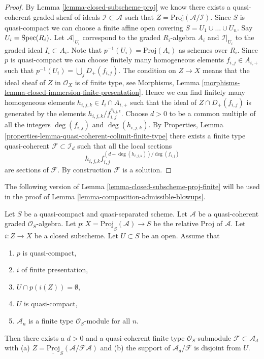 \begin{proof}
By Lemma \ref{lemma-closed-subscheme-proj} we know there exists a
quasi-coherent graded sheaf of ideals $\mathcal{I} \subset \mathcal{A}$
such that $Z = \underline{\text{Proj}}(\mathcal{A}/\mathcal{I})$.
Since $S$ is quasi-compact we can choose a finite affine open covering
$S = U_1 \cup \ldots \cup U_n$. Say $U_i = \mathop{\mathrm{Spec}}(R_i)$. Let
$\mathcal{A}|_{U_i}$ correspond to the graded $R_i$-algebra $A_i$ and
$\mathcal{I}|_{U_i}$ to the graded ideal $I_i \subset A_i$. Note that
$p^{-1}(U_i) = \text{Proj}(A_i)$ as schemes over $R_i$.
Since $p$ is quasi-compact we can choose finitely many homogeneous
elements $f_{i, j} \in A_{i, +}$ such that
$p^{-1}(U_i) = \bigcup_j D_{+}(f_{i, j})$.
The condition on $Z \to X$ means that the ideal sheaf of $Z$ in
$\mathcal{O}_X$ is of finite type, see
Morphisms, Lemma \ref{morphisms-lemma-closed-immersion-finite-presentation}.
Hence we can find finitely many homogeneous elements
$h_{i, j, k} \in I_i \cap A_{i, +}$ such that the ideal of
$Z \cap D_{+}(f_{i, j})$ is generated by the elements
$h_{i, j, k}/f_{i, j}^{e_{i, j, k}}$. Choose $d > 0$ to be a common multiple
of all the integers $\deg(f_{i, j})$ and $\deg(h_{i, j, k})$.
By Properties, Lemma \ref{properties-lemma-quasi-coherent-colimit-finite-type}
there exists a finite type quasi-coherent $\mathcal{F} \subset \mathcal{I}_d$
such that all the local sections
$$
h_{i, j, k}f_{i, j}^{(d - \deg(h_{i, j, k}))/\deg(f_{i, j})}
$$
are sections of $\mathcal{F}$. By construction $\mathcal{F}$ is a solution.
\end{proof}

\noindent
The following version of Lemma \ref{lemma-closed-subscheme-proj-finite}
will be used in the proof of
Lemma \ref{lemma-composition-admissible-blowups}.

\begin{lemma}
\label{lemma-closed-subscheme-proj-finite-type}
Let $S$ be a quasi-compact and quasi-separated scheme.
Let $\mathcal{A}$ be a quasi-coherent graded $\mathcal{O}_S$-algebra.
Let $p : X = \underline{\text{Proj}}_S(\mathcal{A}) \to S$ be the relative
Proj of $\mathcal{A}$. Let $i : Z \to X$ be a closed subscheme.
Let $U \subset S$ be an open. Assume that
\begin{enumerate}
\item $p$ is quasi-compact,
\item $i$ of finite presentation,
\item $U \cap p(i(Z)) = \emptyset$,
\item $U$ is quasi-compact,
\item $\mathcal{A}_n$ is a finite type $\mathcal{O}_S$-module for all $n$.
\end{enumerate}
Then there exists a $d > 0$ and a quasi-coherent finite type
$\mathcal{O}_S$-submodule $\mathcal{F} \subset \mathcal{A}_d$ with (a)
$Z = \underline{\text{Proj}}_S(\mathcal{A}/\mathcal{F}\mathcal{A})$
and (b) the support of $\mathcal{A}_d/\mathcal{F}$ is disjoint from $U$.
\end{lemma}

